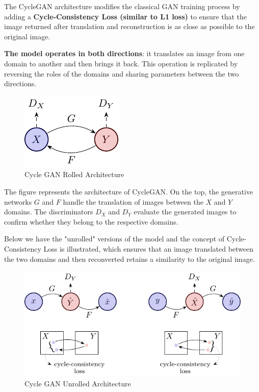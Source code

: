 The CycleGAN architecture modifies the classical GAN training process by adding a \textbf{Cycle-Consistency Loss (similar to L1 loss)} to ensure that the image returned after translation and reconstruction is as close as possible to the original image.

\textbf{The model operates in both directions}: it translates an image from one domain to another and then brings it back. This operation is replicated by reversing the roles of the domains and sharing parameters between the two directions.

\begin{figure}[!htbp]
    \centering
    \includegraphics[width=0.4\linewidth]{tikz/chapter9 - CycleGAN Rolled.pdf}
    \caption{Cycle GAN Rolled Architecture}
\end{figure}

The figure represents the architecture of CycleGAN. On the top, the generative networks 
$G$ and $F$ handle the translation of images between the $X$ and $Y$ domains. The discriminators $D_X$ and $D_Y$ evaluate the generated images to confirm whether they belong to the respective domains. 

Below we have the "unrolled" versions of the model and the concept of Cycle-Consistency Loss is illustrated, which ensures that an image translated between the two domains and then reconverted retains a similarity to the original image.

\begin{figure}[!htbp]
    \centering
    \includegraphics[width=\linewidth]{tikz/chapter9 - CycleGAN Unrolled.pdf}
    \caption{Cycle GAN Unrolled Architecture}
\end{figure}


